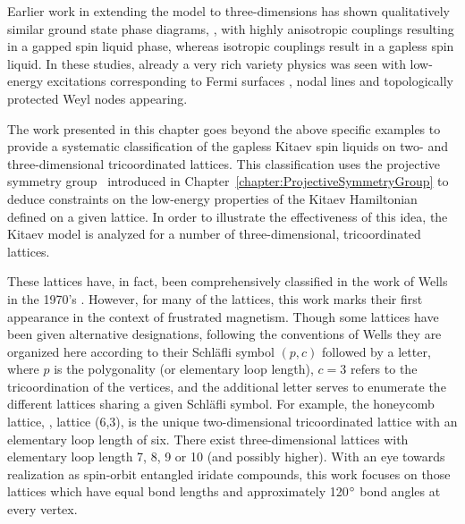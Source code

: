 Earlier work in extending the model to three-dimensions has shown qualitatively similar ground state phase diagrams, \ie, with highly anisotropic couplings resulting in a gapped spin liquid phase, whereas isotropic couplings result in a gapless spin liquid.
In these studies, already a very rich variety physics was seen with low-energy excitations corresponding to Fermi surfaces \cite{HermannsPRB2014}, nodal lines \cite{MandalPRB2009} and topologically protected Weyl nodes \cite{HermannsPRL2015} appearing.

The work presented in this chapter goes beyond the above specific examples to provide a systematic classification of the gapless Kitaev spin liquids on two- and three-dimensional tricoordinated lattices.
This classification uses the projective symmetry group~\cite{WenPRB2002} introduced in Chapter~\ref{chapter:ProjectiveSymmetryGroup} to deduce constraints on the low-energy properties of the Kitaev Hamiltonian defined on a given lattice.
In order to illustrate the effectiveness of this idea, the Kitaev model is analyzed for a number of three-dimensional, tricoordinated lattices.

These lattices have, in fact, been comprehensively classified in the work of Wells in the 1970's \cite{Wells1977}.
However, for many of the lattices, this work marks their first appearance in the context of frustrated magnetism.
Though some lattices have been given alternative designations, following the conventions of Wells they are organized here according to their Schl\"{a}fli symbol $(p,c)$ followed by a letter, where $p$ is the polygonality (or elementary loop length), $c = 3$ refers to the tricoordination of the vertices, and the additional letter serves to enumerate the different lattices sharing a given Schl\"{a}fli symbol.
For example, the honeycomb lattice, \ie, lattice (6,3), is the unique two-dimensional tricoordinated lattice with an elementary loop length of six.
There exist three-dimensional lattices with elementary loop length 7, 8, 9 or 10 (and possibly higher).
With an eye towards realization as spin-orbit entangled iridate compounds, this work focuses on those lattices which have equal bond lengths and approximately 120$\degree$ bond angles at every vertex.

